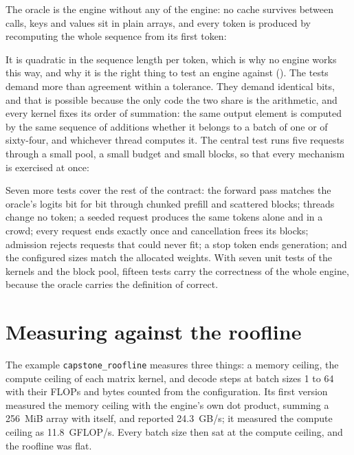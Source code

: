 The oracle is the engine without any of the engine: no cache survives between
calls, keys and values sit in plain arrays, and every token is produced by
recomputing the whole sequence from its first token:


It is quadratic in the sequence length per token, which is why no engine works
this way, and why it is the right thing to test an engine against
(). The tests demand more than agreement within a
tolerance. They demand identical bits, and that is possible because the only
code the two share is the arithmetic, and every kernel fixes its order of
summation: the same output element is computed by the same sequence of
additions whether it belongs to a batch of one or of sixty-four, and whichever
thread computes it. The central test runs five requests through a small pool, a
small budget and small blocks, so that every mechanism is exercised at once:


Seven more tests cover the rest of the contract: the forward pass matches the
oracle's logits bit for bit through chunked prefill and scattered blocks;
threads change no token; a seeded request produces the same tokens alone and in
a crowd; every request ends exactly once and cancellation frees its blocks;
admission rejects requests that could never fit; a stop token ends generation;
and the configured sizes match the allocated weights. With seven unit tests of
the kernels and the block pool, fifteen tests carry the correctness of the whole
engine, because the oracle carries the definition of correct.

\section{Measuring against the roofline}

The example \texttt{capstone\_roofline} measures three things: a memory ceiling,
the compute ceiling of each matrix kernel, and decode steps at batch sizes 1 to
64 with their FLOPs and bytes counted from the configuration. Its first version
measured the memory ceiling with the engine's own dot product, summing a
256~MiB array with itself, and reported 24.3~GB/s; it measured the compute
ceiling as 11.8~GFLOP/s. Every batch size then sat at the compute ceiling, and
the roofline was flat.


